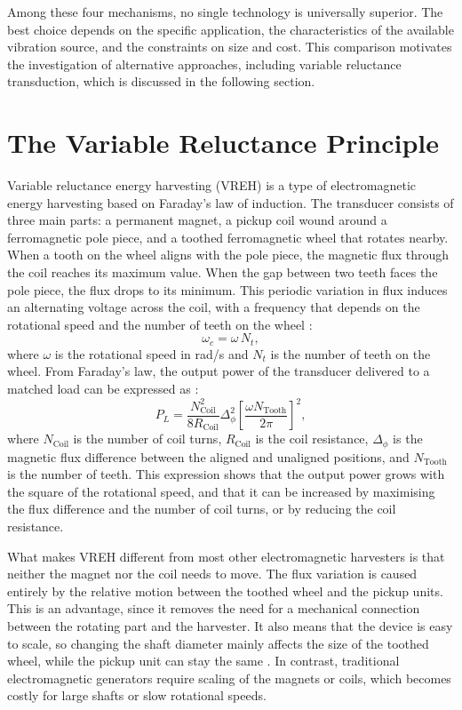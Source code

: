 Among these four mechanisms, no single technology is 
universally superior. The best choice depends on the 
specific application, the characteristics of the available 
vibration source, and the constraints on size and cost. 
This comparison motivates the investigation of 
alternative approaches, including variable reluctance 
transduction, which is discussed in the following section.




\section{The Variable Reluctance Principle}


Variable reluctance energy harvesting (VREH) is a type of
electromagnetic energy harvesting based on Faraday's law
of induction. The transducer consists of three main parts:
a permanent magnet, a pickup coil wound around a
ferromagnetic pole piece, and a toothed ferromagnetic
wheel that rotates nearby. When a tooth on the wheel
aligns with the pole piece, the magnetic flux through the
coil reaches its maximum value. When the gap between two
teeth faces the pole piece, the flux drops to its minimum.
This periodic variation in flux induces an alternating
voltage across the coil, with a frequency that depends on
the rotational speed and the number of teeth on the
wheel \cite{xuSurveyVariableReluctance2018}:
%
\begin{equation}
    \omega_c = \omega \, N_t,
    \label{eq:vreh_freq}
\end{equation}
%
where $\omega$ is the rotational speed in rad/s and $N_t$
is the number of teeth on the wheel. From Faraday's law, the output
power of the transducer delivered to a matched load can be expressed
as \cite{xuDesignModelingOptimization2019a}:
%
\begin{equation}
    P_L = \frac{N_\text{Coil}^2}{8R_\text{Coil}}
    \Delta_\phi^2
    \left[\frac{\omega N_\text{Tooth}}{2\pi}\right]^2,
    \label{eq:vreh_power}
\end{equation}
%
where $N_\text{Coil}$ is the number of coil turns,
$R_\text{Coil}$ is the coil resistance, $\Delta_\phi$ is
the magnetic flux difference between the aligned and
unaligned positions, and $N_\text{Tooth}$ is the number of
teeth. This expression shows that the output power grows
with the square of the rotational speed, and that it can
be increased by maximising the flux difference and the
number of coil turns, or by reducing the coil resistance.

What makes VREH different from most other electromagnetic
harvesters is that neither the magnet nor the coil needs
to move. The flux variation is caused entirely by the
relative motion between the toothed wheel and the pickup units.
This is an advantage, since it removes the need for a mechanical
connection between the rotating part and the harvester. It also
means that the device is easy to scale, so changing the shaft
diameter mainly affects the size of the toothed wheel,
while the pickup unit can stay the
same \cite{xuDesignModelingOptimization2019a}. In contrast, traditional
electromagnetic generators require scaling of the magnets
or coils, which becomes costly for large shafts or slow
rotational speeds.


